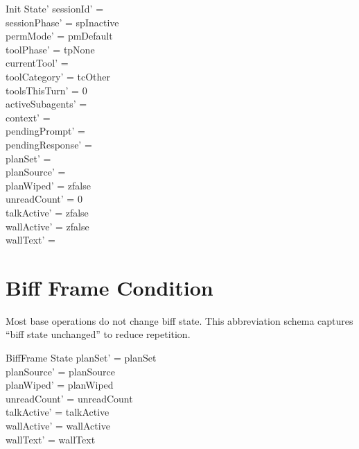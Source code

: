 \documentclass[a4paper,10pt,fleqn]{article}
\begin{document}
\begin{schema}{Init}
  State'
  \where
  sessionId' = \emptyset \\
  sessionPhase' = spInactive \\
  permMode' = pmDefault \\
  toolPhase' = tpNone \\
  currentTool' = \emptyset \\
  toolCategory' = tcOther \\
  toolsThisTurn' = 0 \\
  activeSubagents' = \emptyset \\
  context' = \langle \rangle \\
  pendingPrompt' = \emptyset \\
  pendingResponse' = \emptyset \\
  planSet' = \emptyset \\
  planSource' = \emptyset \\
  planWiped' = zfalse \\
  unreadCount' = 0 \\
  talkActive' = zfalse \\
  wallActive' = zfalse \\
  wallText' = \emptyset
\end{schema}

\section{Biff Frame Condition}

Most base operations do not change biff state. This abbreviation
schema captures ``biff state unchanged'' to reduce repetition.

\begin{schema}{BiffFrame}
  \Delta State
  \where
  planSet' = planSet \\
  planSource' = planSource \\
  planWiped' = planWiped \\
  unreadCount' = unreadCount \\
  talkActive' = talkActive \\
  wallActive' = wallActive \\
  wallText' = wallText
\end{schema}
\end{document}
